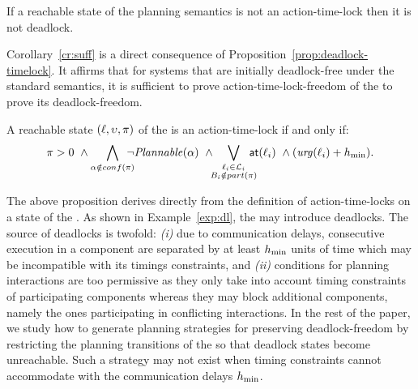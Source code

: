 \begin{corollary}
  \label{cr:suff}
  If a reachable state of the planning semantics is not an action-time-lock then it is not
deadlock.
\end{corollary}
Corollary~\ref{cr:suff} is a direct consequence of Proposition~\ref{prop:deadlock-timelock}.
It affirms that for systems that are initially deadlock-free under the standard semantics, 
it is sufficient to prove action-time-lock-freedom of the \lpsabrb 
to prove its deadlock-freedom.

\begin{proposition}\label{prop:timelocks}
A reachable state $(\ell,\upsilon,\pi)$ of the \lps is an action-time-lock if and only if:
\begin{displaymath}
  \pi>0 \ \wedge \bigwedge_{\alpha \notin conf(\pi)} \hspace*{-2ex} \neg\plntxt{\alpha} \ \wedge
  \hspace*{-1ex} \bigvee_{\substack{\loc_i \in \Loc_i \\ B_i \notin \p{\pi}}} \hspace*{-2ex} 
  \al{\loc_i} \ \wedge (\urg(\loc_i) + \hmin).
\end{displaymath}
\end{proposition}
The above proposition derives directly from the definition of action-time-locks on a state 
of the \lpsb. 
As shown in Example~\ref{exp:dl}, the \lps may introduce deadlocks.
The source of deadlocks is twofold: \emph{(i)} due to communication delays, 
consecutive execution in a component are separated by at least $h_{\min}$ units of time which may 
be incompatible with its timings constraints, and \emph{(ii)} conditions for planning 
interactions are too permissive as they only take into account timing constraints of 
participating components whereas they may block additional components, namely the ones 
participating in conflicting interactions.
In the rest of the paper, we study how to generate planning strategies for preserving 
deadlock-freedom by restricting the planning transitions of the \lpsabrb so that deadlock 
states become unreachable.
Such a strategy may not exist when timing constraints cannot accommodate with the 
communication delays $h_{\min}$.


